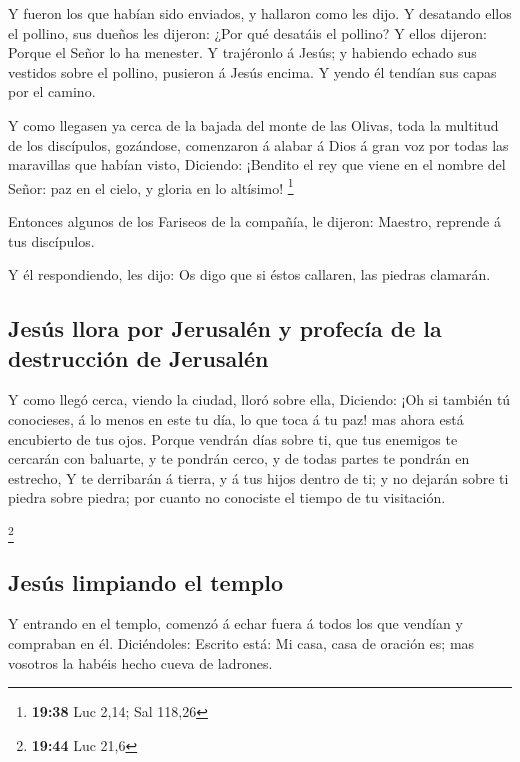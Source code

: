  Y fueron los que habían sido enviados, y hallaron como les
dijo.  Y desatando ellos el pollino, sus dueños les
dijeron: ¿Por qué desatáis el pollino?  Y ellos dijeron:
Porque el Señor lo ha menester.  Y trajéronlo á Jesús; y
habiendo echado sus vestidos sobre el pollino, pusieron á Jesús encima.
 Y yendo él tendían sus capas por el camino.

 Y como llegasen ya cerca de la bajada del monte de las
Olivas, toda la multitud de los discípulos, gozándose, comenzaron á
alabar á Dios á gran voz por todas las maravillas que habían visto,
 Diciendo: ¡Bendito el rey que viene en el nombre del
Señor: paz en el cielo, y gloria en lo altísimo! \footnote{\textbf{19:38}
  Luc 2,14; Sal 118,26}

 Entonces algunos de los Fariseos de la compañía, le
dijeron: Maestro, reprende á tus discípulos.

 Y él respondiendo, les dijo: Os digo que si éstos
callaren, las piedras clamarán.

\hypertarget{jesuxfas-llora-por-jerusaluxe9n-y-profecuxeda-de-la-destrucciuxf3n-de-jerusaluxe9n}{%
\subsection{Jesús llora por Jerusalén y profecía de la destrucción de
Jerusalén}\label{jesuxfas-llora-por-jerusaluxe9n-y-profecuxeda-de-la-destrucciuxf3n-de-jerusaluxe9n}}

 Y como llegó cerca, viendo la ciudad, lloró sobre ella,
 Diciendo: ¡Oh si también tú conocieses, á lo menos en este
tu día, lo que toca á tu paz! mas ahora está encubierto de tus ojos.
 Porque vendrán días sobre ti, que tus enemigos te cercarán
con baluarte, y te pondrán cerco, y de todas partes te pondrán en
estrecho,  Y te derribarán á tierra, y á tus hijos dentro
de ti; y no dejarán sobre ti piedra sobre piedra; por cuanto no
conociste el tiempo de tu visitación.

\footnote{\textbf{19:44} Luc 21,6}

\hypertarget{jesuxfas-limpiando-el-templo}{%
\subsection{Jesús limpiando el
templo}\label{jesuxfas-limpiando-el-templo}}

 Y entrando en el templo, comenzó á echar fuera á todos los
que vendían y compraban en él.  Diciéndoles: Escrito está:
Mi casa, casa de oración es; mas vosotros la habéis hecho cueva de
ladrones.

